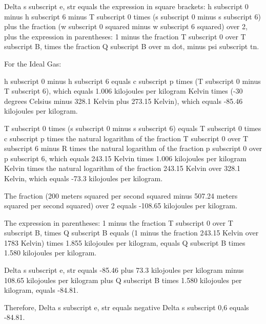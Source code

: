 Delta s subscript e, str equals the expression in square brackets: h subscript 0 minus h subscript 6 minus T subscript 0 times (s subscript 0 minus s subscript 6) plus the fraction (w subscript 0 squared minus w subscript 6 squared) over 2, plus the expression in parentheses: 1 minus the fraction T subscript 0 over T subscript B, times the fraction Q subscript B over m dot, minus psi subscript tn.

For the Ideal Gas:

h subscript 0 minus h subscript 6 equals c subscript p times (T subscript 0 minus T subscript 6), which equals 1.006 kilojoules per kilogram Kelvin times (-30 degrees Celsius minus 328.1 Kelvin plus 273.15 Kelvin), which equals -85.46 kilojoules per kilogram.

T subscript 0 times (s subscript 0 minus s subscript 6) equals T subscript 0 times c subscript p times the natural logarithm of the fraction T subscript 0 over T subscript 6 minus R times the natural logarithm of the fraction p subscript 0 over p subscript 6, which equals 243.15 Kelvin times 1.006 kilojoules per kilogram Kelvin times the natural logarithm of the fraction 243.15 Kelvin over 328.1 Kelvin, which equals -73.3 kilojoules per kilogram.

The fraction (200 meters squared per second squared minus 507.24 meters squared per second squared) over 2 equals -108.65 kilojoules per kilogram.

The expression in parentheses: 1 minus the fraction T subscript 0 over T subscript B, times Q subscript B equals (1 minus the fraction 243.15 Kelvin over 1783 Kelvin) times 1.855 kilojoules per kilogram, equals Q subscript B times 1.580 kilojoules per kilogram.

Delta s subscript e, str equals -85.46 plus 73.3 kilojoules per kilogram minus 108.65 kilojoules per kilogram plus Q subscript B times 1.580 kilojoules per kilogram, equals -84.81.

Therefore, Delta s subscript e, str equals negative Delta s subscript 0,6 equals -84.81.